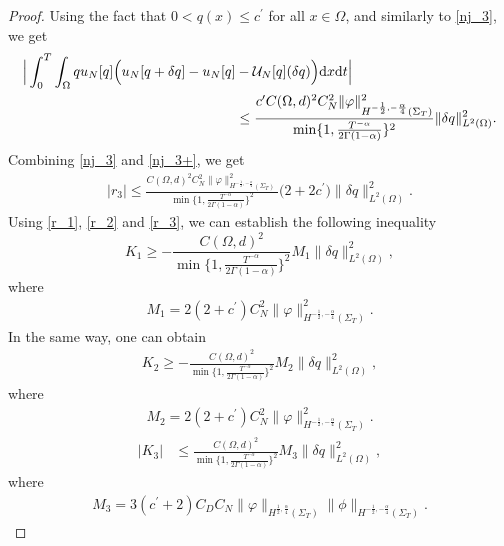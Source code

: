 \documentclass[a4paper,12pt,reqno,natbib]{amsart}
\newcommand{\dx} {\displaystyle\mathrm{d}x}
\newcommand{\dt} {\displaystyle\mathrm{d}t}
\begin{document}
\begin{proof}
Using the fact that $0<q(x)\leq c^\prime$ for all $x\in\Omega$,  and similarly to \eqref{nj_3}, we get
\begin{align}\notag
    \Big|\int_0^T\int_{\Omega} q u_N[q] \Big( u_N[q+\delta q]- u_N[q]&-\mathcal{U}_N[q](\delta q)\Big) \dx\dt\Big|\\&\leq\frac{c^\prime C(\Omega,d)^2C_N^2\|\varphi\|^2_{H^{-\frac{1}{2}, -\frac{\alpha}{4} }(\Sigma_T)}}{\min\{1,\frac{T^{-\alpha}}{2\Gamma(1-\alpha)}\}^2}\|\delta q\|_{L^2(\Omega)}^2.\label{nj_3+}
\end{align}
Combining \eqref{nj_3} and \eqref{nj_3+}, we get
\begin{align} \label{r_3}
    \Big|r_3\Big| \leq \frac{ C(\Omega,d)^2C_N^2\|\varphi\|^2_{H^{-\frac{1}{2}, -\frac{\alpha}{4} }(\Sigma_T)}}{\min\{1,\frac{T^{-\alpha}}{2\Gamma(1-\alpha)}\}^2}\Big(2+2c^\prime\Big)\|\delta q\|_{L^2(\Omega)}^2.
\end{align}
Using \eqref{r_1}, \eqref{r_2} and \eqref{r_3}, we can establish the following inequality
\begin{equation} \label{L_1}
    K_1 \geq -\frac{C(\Omega,d)^2}{\min\{1,\frac{T^{-\alpha}}{2\Gamma(1-\alpha)}\}^2}M_1  \|\delta q\|_{L^2(\Omega)}^2,
\end{equation}
where 
\begin{align*}
    M_1=  2(2+c^\prime) C_N^2\|\varphi\|_{H^{-\frac{1}{2}, -\frac{\alpha}{4} }(\Sigma_T)}^2.
\end{align*}
In the same way, one can obtain
\begin{align}
    \label{L_2}
     K_2 \geq -\frac{C(\Omega,d)^2 }{\min\{1,\frac{T^{-\alpha}}{2\Gamma(1-\alpha)}\}^2}  M_2\|\delta q\|_{L^2(\Omega)}^2,
\end{align}
where 
\begin{align*}
    M_2=  2(2+c^\prime) C_N^2\|\varphi\|_{H^{-\frac{1}{2}, -\frac{\alpha}{4} }(\Sigma_T)}^2.
\end{align*}
     \begin{align}
    \label{L_3}
    \Big|K_3\Big|  &\leq\frac{C(\Omega,d)^2}{\min\{1,\frac{T^{-\alpha}}{2\Gamma(1-\alpha)}\}^2} M_3 \|\delta q\|_{L^2(\Omega)}^2,
\end{align}
where
\begin{align*}
    M_3= 3(c^\prime+2)C_D C_N\|\varphi\|_{H^{\frac{1}{2}, \frac{\alpha}{4} }(\Sigma_T)}\|\phi\|_{H^{-\frac{1}{2}, -\frac{\alpha}{4} }(\Sigma_T)}.
\end{align*}


\end{proof}
\end{document}
